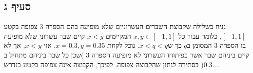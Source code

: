 \documentclass[11pt, oneside]{article}
\newcommand{\qed}{\R{$\blacksquare$}}
\newcommand{\br}{\\\\\\\\\\}
\begin{document}
\subsection{סעיף ג}
נניח בשלילה שקבוצת השברים העשרוניים שלא מופיעה בהם הספרה 3 צפופה בקטע $[-1, 1]$, כלומר עבור כל $x, y \in [-1, 1]$ המקיימים $x < y$ קיים שבר עשרוני שלא מופיעה בו הספרה 3 המסומן ב$q$ כך ש$x < q < y$. נוכל לקחת $x = 0.3, y = 0.35$. אזי $x < y$, אך לא קיים ביניהם שבר אשר בפיתוחו העשרוני לא מופיעה הספרה 3 )שכן כל שבר ביניהם מתחיל ב$0.3\dots$( בסתירה לנתון שהקבוצה צפופה. לפיכך, הקבוצה אינה צפופה בקטע כנדרש.
\br\qed
\end{document}
